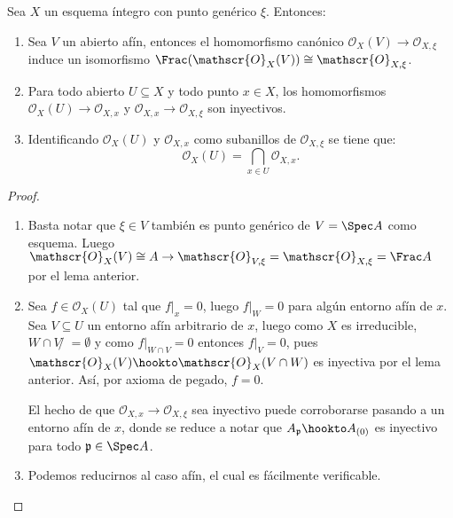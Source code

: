 \begin{prop}
	Sea $X$ un esquema íntegro con punto genérico $\xi$. Entonces:
	\begin{enumerate}
		\item Sea $V$ un abierto afín, entonces el homomorfismo canónico $\mathscr{O}_X (V ) \to \mathscr{O}_{X,\xi}$
			induce un isomorfismo $\Frac(\mathscr{O}_X(V)) \cong \mathscr{O}_{X,\xi}$.
		\item Para todo abierto $U \subseteq X$ y todo punto $x \in X$, los homomorfismos $\mathscr{O}_X (U ) \to \mathscr{O}_{X,x}$
			y $\mathscr{O}_{X,x} \to \mathscr{O}_{X,\xi}$ son inyectivos.
		\item Identificando $\mathscr{O}_X (U )$ y $\mathscr{O}_{X,x}$ como subanillos de $\mathscr{O}_{X,\xi}$ se tiene que:
			$$ \mathscr{O}_X (U ) = \bigcap_{x\in U} \mathscr{O}_{X, x}. $$
	\end{enumerate}
\end{prop}
\begin{proof}
	\begin{enumerate}
		\item Basta notar que $\xi \in V$ también es punto genérico de $V = \Spec A$ como esquema.
			Luego $\mathscr{O}_X(V) \cong A \to \mathscr{O}_{V,\xi} = \mathscr{O}_{X,\xi} = \Frac A$ por el lema anterior.

		\item Sea $f \in \mathscr{O}_X (U )$ tal que $f|_x = 0$, luego $f|_W = 0$ para algún entorno afín de $x$.
			Sea $V \subseteq U$ un entorno afín arbitrario de $x$, luego como $X$ es irreducible, $W \cap V ̸= \emptyset$ y como
			$f|_{W \cap V} = 0$ entonces $f|_V = 0$, pues $\mathscr{O}_X (V ) \hookto \mathscr{O}_X (V \cap W )$ es inyectiva por el lema anterior.
			Así, por axioma de pegado, $f = 0$.

			El hecho de que $\mathscr{O}_{X,x} \to \mathscr{O}_{X,\xi}$ sea inyectivo puede corroborarse pasando
			a un entorno afín de $x$, donde se reduce a notar que $A_{\mathfrak{p}} \hookto A_{(0)}$ es
			inyectivo para todo $\mathfrak{p} \in \Spec A$.

		\item Podemos reducirnos al caso afín, el cual es fácilmente verificable. \qedhere
	\end{enumerate}
\end{proof}


